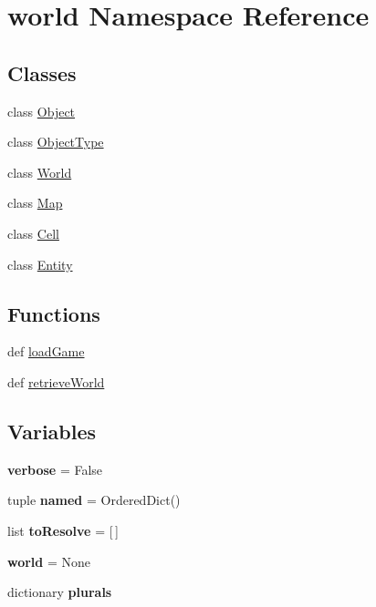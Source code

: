 \hypertarget{namespaceworld}{\section{world \-Namespace \-Reference}
\label{namespaceworld}
}
\subsection*{\-Classes}
\begin{DoxyCompactItemize}
\item 
class \hyperlink{classworld_1_1_object}{\-Object}
\item 
class \hyperlink{classworld_1_1_object_type}{\-Object\-Type}
\item 
class \hyperlink{classworld_1_1_world}{\-World}
\item 
class \hyperlink{classworld_1_1_map}{\-Map}
\item 
class \hyperlink{classworld_1_1_cell}{\-Cell}
\item 
class \hyperlink{classworld_1_1_entity}{\-Entity}
\end{DoxyCompactItemize}
\subsection*{\-Functions}
\begin{DoxyCompactItemize}
\item 
def \hyperlink{namespaceworld_a5abd4d24e7f32b12819e3d30a7e5a3b2}{load\-Game}
\item 
def \hyperlink{namespaceworld_afb11223978aebb27bd012454a1b624e0}{retrieve\-World}
\end{DoxyCompactItemize}
\subsection*{\-Variables}
\begin{DoxyCompactItemize}
\item 
\hypertarget{namespaceworld_ac730142b2743b2ec4b92993f8cb593b9}{{\bfseries verbose} = \-False}\label{namespaceworld_ac730142b2743b2ec4b92993f8cb593b9}

\item 
\hypertarget{namespaceworld_a711882491a9337bbfe5afd302c141c27}{tuple {\bfseries named} = \-Ordered\-Dict()}\label{namespaceworld_a711882491a9337bbfe5afd302c141c27}

\item 
\hypertarget{namespaceworld_ad4073ddd52f0b33c051e6e673055647f}{list {\bfseries to\-Resolve} = \mbox{[}$\,$\mbox{]}}\label{namespaceworld_ad4073ddd52f0b33c051e6e673055647f}

\item 
\hypertarget{namespaceworld_a114374ad5a72ef1b60e51fddcffb4985}{{\bfseries world} = \-None}\label{namespaceworld_a114374ad5a72ef1b60e51fddcffb4985}

\item 
dictionary {\bfseries plurals}
\end{DoxyCompactItemize}



